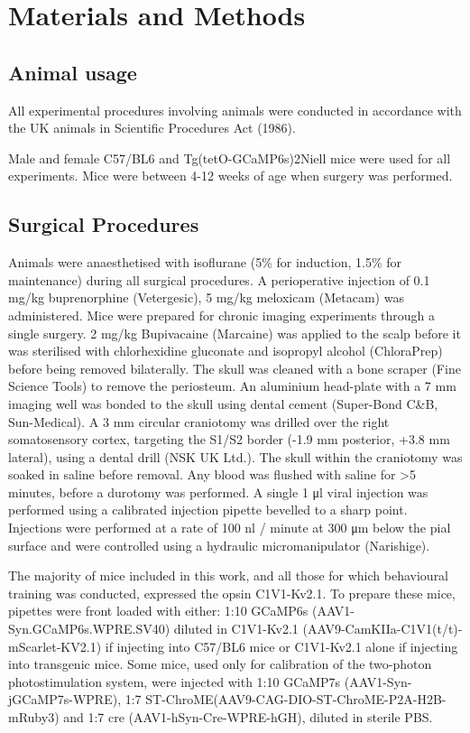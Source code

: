 \chapter{\label{ch:2-Materials and Methods}Materials and Methods} 

\minitoc

\section{Animal usage}

All experimental procedures involving animals were conducted in accordance with the UK animals in Scientific Procedures Act (1986).

Male and female C57/BL6 and Tg(tetO-GCaMP6s)2Niell mice were used for all experiments. Mice were between 4-12 weeks of age when surgery was performed.

\section{Surgical Procedures}
Animals were anaesthetised with isoflurane (5\% for induction, 1.5\% for maintenance) during all surgical procedures. A perioperative injection of 0.1 mg/kg buprenorphine (Vetergesic), 5 mg/kg meloxicam (Metacam) was administered. Mice were prepared for chronic imaging experiments through a single surgery. 2 mg/kg Bupivacaine (Marcaine) was applied to the scalp before it was sterilised with chlorhexidine gluconate and isopropyl alcohol (ChloraPrep) before being removed bilaterally. The skull was cleaned with a bone scraper (Fine Science Tools) to remove the periosteum. An aluminium head-plate with a 7 mm imaging well was bonded to the skull using dental cement (Super-Bond C\&B, Sun-Medical). A 3 mm circular craniotomy was drilled over the right somatosensory cortex, targeting the S1/S2 border (-1.9 mm posterior, +3.8 mm lateral), using a dental drill (NSK UK Ltd.). The skull within the craniotomy was soaked in saline before removal. Any blood was flushed with saline for >5 minutes, before a durotomy was performed. A single 1 μl viral injection was performed using a calibrated injection pipette bevelled to a sharp point. Injections were performed at a rate of 100 nl / minute at 300 μm below the pial surface and were controlled using a hydraulic micromanipulator (Narishige). 

 The majority of mice included in this work, and all those for which behavioural training was conducted, expressed the opsin C1V1-Kv2.1. To prepare these mice, pipettes were front loaded with either: 1:10 GCaMP6s (AAV1-Syn.GCaMP6s.WPRE.SV40) diluted in C1V1-Kv2.1 (AAV9-CamKIIa-C1V1(t/t)-mScarlet-KV2.1) if injecting into C57/BL6 mice or C1V1-Kv2.1 alone if injecting into transgenic mice. Some mice, used only for calibration of the two-photon photostimulation system, were injected with 1:10 GCaMP7s (AAV1-Syn-jGCaMP7s-WPRE), 1:7 ST-ChroME(AAV9-CAG-DIO-ST-ChroME-P2A-H2B-mRuby3) and 1:7 cre (AAV1-hSyn-Cre-WPRE-hGH), diluted in sterile PBS.

